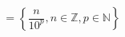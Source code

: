 \documentclass[preview]{standalone}
\begin{document}
\begin{align*}
= \left \{ \dfrac{n}{10^p},n\in\mathbb{Z},p\in\mathbb{N} \right \}
\end{align*}
\end{document}
